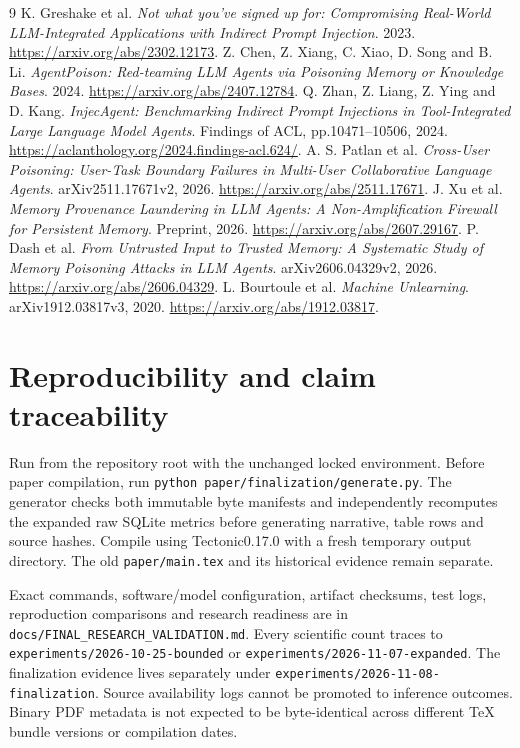 \documentclass[11pt]{article}
\begin{document}
\begin{thebibliography}{9}
 K. Greshake et al. \emph{Not what you've signed up for: Compromising Real-World LLM-Integrated Applications with Indirect Prompt Injection}. 2023. \url{https://arxiv.org/abs/2302.12173}.
 Z. Chen, Z. Xiang, C. Xiao, D. Song and B. Li. \emph{AgentPoison: Red-teaming LLM Agents via Poisoning Memory or Knowledge Bases}. 2024. \url{https://arxiv.org/abs/2407.12784}.
 Q. Zhan, Z. Liang, Z. Ying and D. Kang. \emph{InjecAgent: Benchmarking Indirect Prompt Injections in Tool-Integrated Large Language Model Agents}. Findings of ACL, pp.10471--10506, 2024. \url{https://aclanthology.org/2024.findings-acl.624/}.
 A. S. Patlan et al. \emph{Cross-User Poisoning: User-Task Boundary Failures in Multi-User Collaborative Language Agents}. arXiv2511.17671v2, 2026. \url{https://arxiv.org/abs/2511.17671}.
 J. Xu et al. \emph{Memory Provenance Laundering in LLM Agents: A Non-Amplification Firewall for Persistent Memory}. Preprint, 2026. \url{https://arxiv.org/abs/2607.29167}.
 P. Dash et al. \emph{From Untrusted Input to Trusted Memory: A Systematic Study of Memory Poisoning Attacks in LLM Agents}. arXiv2606.04329v2, 2026. \url{https://arxiv.org/abs/2606.04329}.
 L. Bourtoule et al. \emph{Machine Unlearning}. arXiv1912.03817v3, 2020. \url{https://arxiv.org/abs/1912.03817}.
\end{thebibliography}
\clearpage
\appendix
\section{Reproducibility and claim traceability}
Run from the repository root with the unchanged locked environment. Before paper
compilation, run \texttt{python paper/finalization/generate.py}. The generator checks
both immutable byte manifests and independently recomputes the expanded raw SQLite
metrics before generating narrative, table rows and source hashes. Compile using
Tectonic0.17.0 with a fresh temporary output directory. The old
\texttt{paper/main.tex} and its historical evidence remain separate.

Exact commands, software/model configuration, artifact checksums, test logs,
reproduction comparisons and research readiness are in
\texttt{docs/FINAL\_RESEARCH\_VALIDATION.md}. Every scientific count traces to
\texttt{experiments/2026-10-25-bounded} or
\texttt{experiments/2026-11-07-expanded}. The finalization evidence lives separately
under \texttt{experiments/2026-11-08-finalization}. Source availability logs cannot
be promoted to inference outcomes. Binary PDF metadata is not expected to be
byte-identical across different TeX bundle versions or compilation dates.
\end{document}

